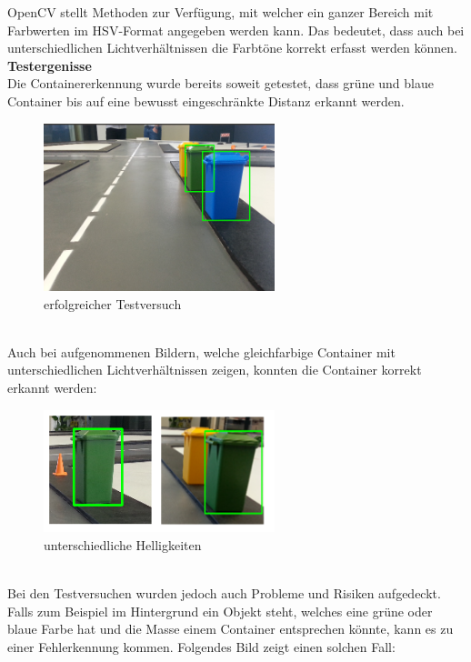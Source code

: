OpenCV stellt Methoden zur Verfügung, mit welcher ein ganzer Bereich mit Farbwerten im HSV-Format angegeben werden kann. Das bedeutet, dass auch bei unterschiedlichen Lichtverhältnissen die Farbtöne korrekt erfasst werden können.
\\[0.2cm]
\textbf{Testergenisse} \\
Die Containererkennung wurde bereits soweit getestet, dass grüne und blaue Container bis auf eine bewusst eingeschränkte Distanz erkannt werden. 
\begin{figure}[h!]%
\centering
\includegraphics[width=0.6\textwidth]{03_Loesungskonzept/pictures/containererkennung_blau_gruen.png}
\caption{erfolgreicher Testversuch}
\label{fig:erfolgreicher Testversuch}
\end{figure}\\
Auch bei aufgenommenen Bildern, welche gleichfarbige Container mit unterschiedlichen Lichtverhältnissen zeigen, konnten die Container korrekt erkannt werden:
\begin{figure}[h!]%
\centering
\includegraphics[width=0.6\textwidth]{03_Loesungskonzept/pictures/containererkennung_div_brightness.png}
\caption{unterschiedliche Helligkeiten}
\label{fig:unterschiedliche Helligkeiten}
\end{figure}\\
Bei den Testversuchen wurden jedoch auch Probleme und Risiken aufgedeckt. Falls zum Beispiel im Hintergrund ein Objekt steht, welches eine grüne oder blaue Farbe hat und die Masse einem Container entsprechen könnte, kann es zu einer Fehlerkennung kommen. Folgendes Bild zeigt einen solchen Fall:
